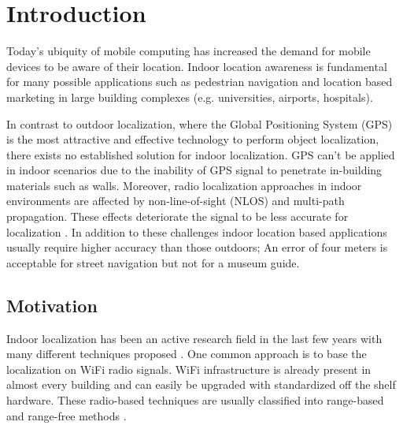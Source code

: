 
\chapter{Introduction} %

\label{Chapter1} %


\newcommand{\keyword}[1]{\textbf{#1}}
\newcommand{\tabhead}[1]{\textbf{#1}}
\newcommand{\code}[1]{\texttt{#1}}
\newcommand{\file}[1]{\texttt{\bfseries#1}}
\newcommand{\option}[1]{\texttt{\itshape#1}}


Today's ubiquity of mobile computing has increased the demand for mobile devices to be aware of their location. Indoor location awareness is fundamental for many possible applications such as pedestrian navigation and location based marketing in large building complexes (e.g. universities, airports, hospitals).

In contrast to outdoor localization, where the Global Positioning System (GPS) is the most attractive and effective technology to perform object localization, there exists no established solution for indoor localization. GPS can't be applied in indoor scenarios due to the inability of GPS signal to penetrate in-building materials such  as walls. Moreover, radio localization approaches in indoor environments are affected by non-line-of-sight (NLOS) and multi-path propagation. These effects deteriorate the signal to be less accurate for localization \cite{JoseMaster,multipathEffects}. In addition to these challenges indoor location based applications usually require higher accuracy than those outdoors; An error of four meters is acceptable for street navigation but not for a museum guide.

\section{Motivation}

Indoor localization has been an active research field in the last few years with many different techniques proposed \cite{surveyIndoorTechniques,surveyWirelessPersonal}. One common approach is to base the localization on WiFi radio signals. WiFi infrastructure is already present in almost every building and can easily be upgraded with standardized off the shelf hardware. These radio-based techniques are usually classified into range-based and range-free methods \cite{FineGrainedIndoorTracking}.

